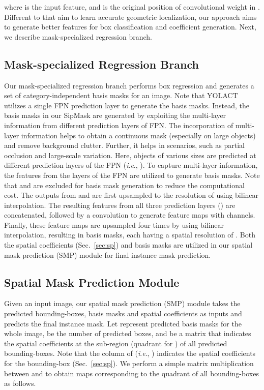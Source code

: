 \documentclass[runningheads]{llncs}
\newcommand{\ie}{\textit{i}.\textit{e}.}
\begin{document}
where  is the input feature, and   is the original position of convolutional weight  in  . Different to \cite{Yang_DenseRepPoints_ECCV_2020,Yang_RepPoints_ICCV_2019} that aim to learn accurate geometric localization,  our approach aims  to generate better features for box classification and coefficient generation. Next, we describe mask-specialized regression branch.

\subsection{Mask-specialized Regression Branch}\label{sec:mbm}
Our mask-specialized regression branch performs box regression and generates a set of category-independent basis masks for an image. Note that YOLACT utilizes a single FPN prediction layer to generate the basis masks. Instead, the basis masks in our SipMask are generated by exploiting the multi-layer information from different prediction layers of  FPN. The incorporation of multi-layer information  helps to obtain a continuous mask (especially on large objects) and remove background clutter. Further, it helps in scenarios, such as partial occlusion and large-scale variation.
Here, objects of various sizes are predicted at different prediction layers of the FPN (\ie, ).  To capture multi-layer  information, the features from the  layers of the FPN are utilized to generate basis masks.
Note that  and  are excluded for basis mask generation to reduce the computational cost.
The outputs from   and  are first upsampled to the resolution of   using bilinear interpolation. The resulting features from all three prediction layers () are  concatenated, followed by  a  convolution to generate feature maps with  channels. Finally, these feature maps are upsampled four times by using bilinear interpolation,
resulting in   basis masks, each having a spatial resolution of . Both the spatial coefficients (Sec.~\ref{sec:sp}) and basis masks are utilized in our spatial mask prediction (SMP) module for final instance mask prediction. 


\subsection{Spatial Mask Prediction Module}\label{sec:smp}
Given an input image, our spatial mask prediction (SMP) module takes the predicted bounding-boxes, basis masks and  spatial coefficients as inputs and predicts the final instance mask. 
Let  represent  predicted basis masks for the whole image,   be the number of predicted boxes, and 
 be a  matrix that indicates the spatial coefficients at the  sub-region (quadrant for ) of all   predicted bounding-boxes.  Note that the column   of  (\ie, ) indicates the spatial coefficients for the bounding-box  (Sec.~\ref{sec:sp}). 
We perform a simple matrix multiplication  between  and  to obtain   maps  corresponding to the  quadrant of all bounding-boxes as follows.  
\end{document}

